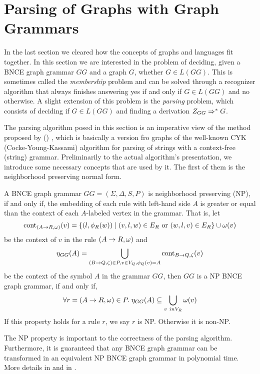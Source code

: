 \section{Parsing of Graphs with Graph Grammars}
\label{sec:parsing}
In the last section we cleared how the concepts of graphs and languages fit together. In this section we are interested in the problem of deciding, given a BNCE graph grammar $GG$ and a graph $G$, whether $G \in L(GG)$. This is sometimes called the \textit{membership} problem and can be solved through a recognizer algorithm that always finishes answering yes if and only if $G \in L(GG)$ and no otherwise. A slight extension of this problem is the \textit{parsing} problem, which consists of deciding if $G \in L(GG)$ and finding a derivation $Z_{GG} \Rightarrow^*_{} G$.


The parsing algorithm posed in this section is an imperative view of the method proposed by ()%
, which is basically a version fro graphs of the well-known CYK (Cocke-Young-Kassami) algorithm for parsing of strings with a context-free (string) grammar. Preliminarily to the actual algorithm's presentation, we introduce some necessary concepts that are used by it. The first of them is the neighborhood preserving normal form.

\begin{definition}
	\label{def:np}
	A BNCE graph grammar $GG = (\Sigma, \Delta, S, P)$ is neighborhood preserving (NP), if and only if, the embedding of each rule with left-hand side $A$ is greater or equal than the context of each $A$-labeled vertex in the grammar. That is, let 
	\[\operatorname{cont}_{(A \to R,\omega)}(v) =\{(l,\phi_{R}(w)) \; | \; (v,l,w) \in E_R \text { or } (w,l,v) \in E_R \} \cup \omega(v) \]
	be the context of $v$ in the rule $(A \to R,\omega)$ and
	\[\eta_{GG}(A) = \bigcup_{(B \to Q,\zeta) \in P, v \in V_Q, \phi_Q(v) = A} \operatorname{cont}_{B \to Q,\zeta}(v) \] 
	be the context of the symbol $A$ in the grammar $GG$, then $GG$ is a NP BNCE graph grammar, if and only if,
	\[ \forall r = (A \to R,\omega) \in P . \; \eta_{GG}(A) \subseteq \bigcup_{v \ in V_R} \omega(v) \]
	If this property holds for a rule $r$, we say $r$ is NP. Otherwise it is non-NP.
\end{definition}

The NP property is important to the correctness of the parsing algorithm. Furthermore, it is guaranteed that any BNCE graph grammar can be transformed in an equivalent NP BNCE graph grammar in polynomial time. More details in \cite{rozenberg1986boundary} and in \cite{skodinis1998neighborhood}.

